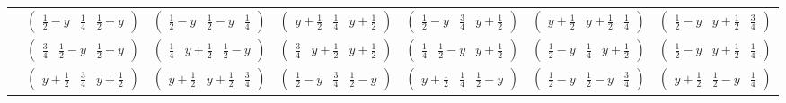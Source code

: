 \documentclass[fleqn,9pt,landscape]{jsarticle}
\begin{document}
\begin{center}
\begin{longtable}{ccccccc}
& $ \begin{pmatrix} \frac{1}{2} - y & \frac{1}{4} & \frac{1}{2} - y \end{pmatrix} $ & $ \begin{pmatrix} \frac{1}{2} - y & \frac{1}{2} - y & \frac{1}{4} \end{pmatrix} $ & $ \begin{pmatrix} y + \frac{1}{2} & \frac{1}{4} & y + \frac{1}{2} \end{pmatrix} $ & $ \begin{pmatrix} \frac{1}{2} - y & \frac{3}{4} & y + \frac{1}{2} \end{pmatrix} $ & $ \begin{pmatrix} y + \frac{1}{2} & y + \frac{1}{2} & \frac{1}{4} \end{pmatrix} $ & $ \begin{pmatrix} \frac{1}{2} - y & y + \frac{1}{2} & \frac{3}{4} \end{pmatrix} $ \\
& $ \begin{pmatrix} \frac{3}{4} & \frac{1}{2} - y & \frac{1}{2} - y \end{pmatrix} $ & $ \begin{pmatrix} \frac{1}{4} & y + \frac{1}{2} & \frac{1}{2} - y \end{pmatrix} $ & $ \begin{pmatrix} \frac{3}{4} & y + \frac{1}{2} & y + \frac{1}{2} \end{pmatrix} $ & $ \begin{pmatrix} \frac{1}{4} & \frac{1}{2} - y & y + \frac{1}{2} \end{pmatrix} $ & $ \begin{pmatrix} \frac{1}{2} - y & \frac{1}{4} & y + \frac{1}{2} \end{pmatrix} $ & $ \begin{pmatrix} \frac{1}{2} - y & y + \frac{1}{2} & \frac{1}{4} \end{pmatrix} $ \\
& $ \begin{pmatrix} y + \frac{1}{2} & \frac{3}{4} & y + \frac{1}{2} \end{pmatrix} $ & $ \begin{pmatrix} y + \frac{1}{2} & y + \frac{1}{2} & \frac{3}{4} \end{pmatrix} $ & $ \begin{pmatrix} \frac{1}{2} - y & \frac{3}{4} & \frac{1}{2} - y \end{pmatrix} $ & $ \begin{pmatrix} y + \frac{1}{2} & \frac{1}{4} & \frac{1}{2} - y \end{pmatrix} $ & $ \begin{pmatrix} \frac{1}{2} - y & \frac{1}{2} - y & \frac{3}{4} \end{pmatrix} $ & $ \begin{pmatrix} y + \frac{1}{2} & \frac{1}{2} - y & \frac{1}{4} \end{pmatrix} $ \\ \hline

\end{longtable}
\end{center}
\end{document}

